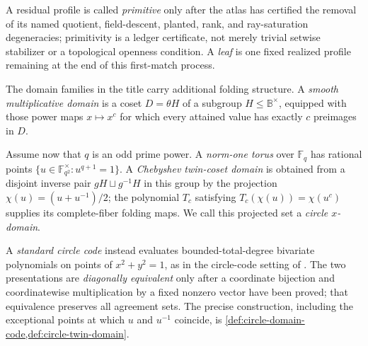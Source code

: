 \documentclass[12pt,a4paper]{amsart}
\numberwithin{equation}{section}
\theoremstyle{remark}
\newcommand{\F}{\mathbb F}
\newcommand{\B}{\mathbb B}
\begin{document}
A residual profile is called \emph{primitive} only after the atlas has certified the
removal of its named quotient, field-descent, planted, rank, and ray-saturation
degeneracies; primitivity is a ledger certificate, not merely trivial
setwise stabilizer or a topological openness condition.  A \emph{leaf} is
one fixed realized profile remaining at the end of this first-match
process.

The domain families in the title carry additional folding structure.  A
\emph{smooth multiplicative domain} is a coset \(D=\theta H\) of a
subgroup \(H\le\B^\times\), equipped with those power maps
\(x\mapsto x^c\) for which every attained value has exactly \(c\)
preimages in \(D\).

Assume now that \(q\) is an odd prime power.  A \emph{norm-one torus} over \(\F_q\) has rational
points \(\{u\in\F_{q^2}^\times:u^{q+1}=1\}\).  A
\emph{Chebyshev twin-coset domain} is obtained from a disjoint inverse pair
\(gH\sqcup g^{-1}H\) in this group by the projection
\(\chi(u)=(u+u^{-1})/2\); the polynomial \(T_c\) satisfying
\(T_c(\chi(u))=\chi(u^c)\) supplies its complete-fiber folding maps.  We
call this projected set a \emph{circle \(x\)-domain}.

A \emph{standard circle code} instead evaluates bounded-total-degree
bivariate polynomials on points of \(x^2+y^2=1\), as in the circle-code
setting of \cite{HLP24}.  The two presentations
are \emph{diagonally equivalent} only after a coordinate bijection and
coordinatewise multiplication by a fixed nonzero vector have been proved;
that equivalence preserves all agreement sets.  The precise construction,
including the exceptional points at which \(u\) and \(u^{-1}\) coincide,
is \cref{def:circle-domain-code,def:circle-twin-domain}.
\end{document}
